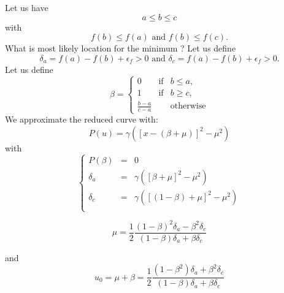 \documentclass[aps,12pt]{revtex4}
\begin{document}
Let us have 
$$a \leq b \leq c$$ 
with 
$$f(b)\leq f(a) \text{ and } f(b)\leq f(c).$$
What is most likely location for the minimum ?
Let us define $$\delta_a = f(a)-f(b) + \epsilon_f > 0 \text{ and } \delta_c = f(a)-f(b) + \epsilon_f > 0.$$ 
Let us define 
$$
	\beta = 
	\left\lbrace
	\begin{array}{rcl}
	0 & \text{if} & b\leq a,\\
	1 & \text{if} & b\geq c,\\
	\frac{b-a}{c-a} & & \text{otherwise}
	\end{array}
	\right.
$$
We approximate the reduced curve with:
$$
	P(u) = \gamma \left( \left[ x -(\beta+\mu)\right]^2 - \mu^2 \right)
$$
with
\begin{equation}
	\left\lbrace
	\begin{array}{rcl}
	P(\beta) & = & 0\\
	\delta_a & = & \gamma \left( [\beta+\mu]^2 - \mu^2 \right)\\
 	\delta_c & = & \gamma \left( [ (1-\beta)+\mu]^2 - \mu^2 \right)\\
	\end{array}
	\right.
\end{equation}

\begin{equation}
	\mu = \dfrac{1}{2} \dfrac{(1-\beta)^2\delta_a - \beta^2 \delta_c}{(1-\beta)\delta_a + \beta \delta_c}
\end{equation}

and
\begin{equation}
	u_0=	\mu + \beta = \dfrac{1}{2} \dfrac{(1-\beta^2) \delta_a + \beta^2 \delta_c}{(1-\beta)\delta_a + \beta \delta_c}
\end{equation}
\end{document}
